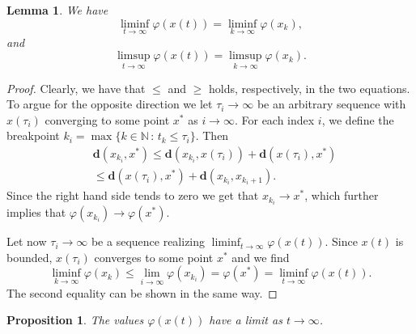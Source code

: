 \documentclass{article}
\newtheorem{proposition}{Proposition}
\newtheorem{lemma}{Lemma}
\newcommand{\BN}{\mathbb{N}}
\newcommand{\bd}{\mathbf{d}}
\begin{document}
\begin{lemma}
    We have
    \begin{equation}
        \liminf_{t\to\infty}\varphi(x(t))=\liminf_{k\to\infty}\varphi(x_k),
    \end{equation}
    and
    \begin{equation}
\limsup_{t\to\infty}\varphi(x(t))=\limsup_{k\to\infty}\varphi(x_k).
    \end{equation}
\end{lemma}

\begin{proof}
    Clearly, we have that $\leq$ and $\geq$ holds, respectively, in the two equations. To argue for the opposite direction we let $\tau_i\to\infty$ be an arbitrary sequence with $x(\tau_i)$ converging to some point $x^*$ as $i\to\infty$. For each index $i$, we define the breakpoint $k_i=\max\{k\in\BN\,:\,t_k\leq \tau_i\}$. Then
    \begin{equation}
        \begin{aligned}
            &\bd(x_{k_i},x^*)\leq \bd(x_{k_i},x(\tau_i))+\bd(x(\tau_i),x^*)\\
            &\leq \bd(x(\tau_i),x^*)+\bd(x_{k_i},x_{k_i+1}).
        \end{aligned}
    \end{equation}
    Since the right hand side tends to zero we get that $x_{k_i}\to x^*$, which further implies that $\varphi(x_{k_i})\to\varphi(x^*)$. 

    Let now $\tau_i\to\infty$ be a sequence realizing $\liminf_{t\to\infty}\varphi(x(t))$. Since $x(t)$ is bounded, $x(\tau_i)$ converges to some point $x^*$ and we find
    \begin{equation}
        \liminf_{k\to\infty}\varphi(x_k)\leq \lim_{i\to\infty}\varphi(x_{k_i})=\varphi(x^*)=\liminf_{t\to\infty}\varphi(x(t)).
    \end{equation}
    The second equality can be shown in the same way. 
\end{proof}



\begin{proposition}
    The values $\varphi(x(t))$ have a limit as $t\to\infty$.
\end{proposition}
\end{document}
